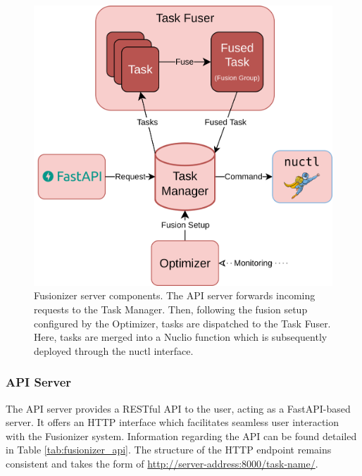 \begin{figure}
    \centering
    \includegraphics[width=.8\linewidth]{../figures/fusionizer_components}
    \caption{
        Fusionizer server components. The API server forwards incoming requests
        to the Task Manager. Then, following the fusion setup configured by the
        Optimizer, tasks are dispatched to the Task Fuser. Here, tasks are
        merged into a Nuclio function which is subsequently deployed through the
        nuctl interface.
    }
    \label{fig:fusionizer_components}
\end{figure}

\subsubsection{API Server}


The API server provides a RESTful API to the user, acting as a FastAPI-based
server. It offers an HTTP interface which facilitates seamless user interaction
with the Fusionizer system. Information regarding the API can be found detailed
in Table \ref{tab:fusionizer_api}. The structure of the HTTP endpoint remains
consistent and takes the form of \url{http://server-address:8000/task-name/}.

